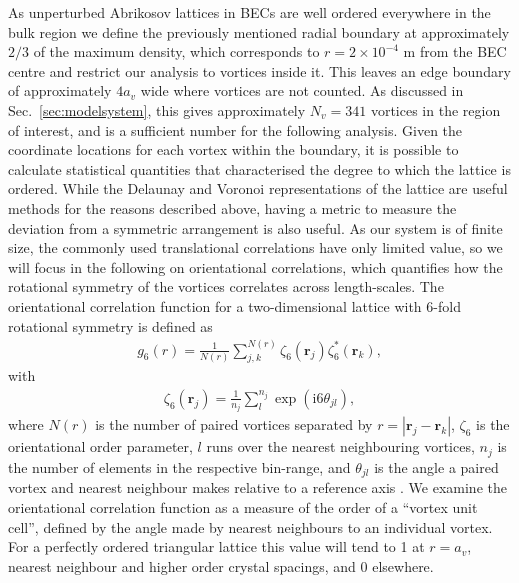 As unperturbed Abrikosov lattices in BECs are well ordered everywhere in the bulk region \cite{Vtx:Anglin_arxiv_2002} we define the previously mentioned radial boundary at approximately $2/3$ of the maximum density, which corresponds to $r=2\times 10^{-4}$ m from the BEC centre and restrict our analysis to vortices inside it. This leaves an edge boundary of approximately $4a_v$ wide where vortices are not counted. As discussed in Sec.~\ref{sec:modelsystem}, this gives approximately $N_v=341$ vortices in the region of interest, and is a sufficient number for the following analysis. Given the coordinate locations for each vortex within the boundary, it is possible to calculate statistical quantities that characterised the degree to which the lattice is ordered. While the Delaunay and Voronoi representations of the lattice are useful methods for the reasons described above, having a metric to measure the deviation from a symmetric arrangement is also useful. As our system is of finite size, the commonly used translational correlations have only limited value, so we will focus in the following on orientational correlations, which quantifies how the rotational symmetry of the vortices correlates across length-scales. The orientational correlation function for a two-dimensional lattice with 6-fold rotational symmetry is defined as
\begin{align}
	g_6(r) = \frac{1}{N(r)}\displaystyle\sum\limits_{j,k}^{N(r)}\zeta_6(\mathbf{r}_j)\zeta_6^{*}(\mathbf{r}_k),
\end{align}
with
\begin{align}
	\zeta_6(\mathbf{r}_{j}) =  \frac{1}{n_j}\displaystyle\sum\limits_{l}^{n_j}\exp(\mathrm{i}6\theta_{jl}),
\end{align}
where $N(r)$ is the number of paired vortices separated by $r=|\mathbf{r}_j - \mathbf{r}_k|$, $\zeta_6$ is the orientational order parameter, $l$ runs over the nearest neighbouring vortices, $n_j$ is the number of elements in the respective bin-range, and $\theta_{jl}$ is the angle a paired vortex and nearest neighbour makes relative to a reference axis \cite{Guillamon_nat_2014}. We examine the orientational correlation function as a measure of the order of a ``vortex unit cell'', defined by the angle made by nearest neighbours to an individual vortex. For a perfectly ordered triangular lattice this value will tend to 1 at $r=a_v$,  nearest neighbour and higher order crystal spacings, and 0 elsewhere.

